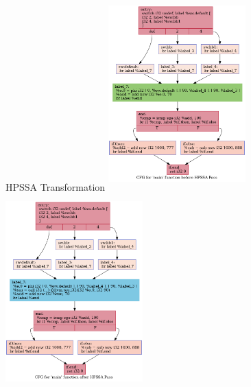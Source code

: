 \documentclass{beamer}
\begin{document}
\begin{frame}{HPSSA Transformation}
	\includegraphics[width=5.3cm,height=7.5cm]{baseline.dot.png}
	\includegraphics[width=5.3cm,height=7.5cm]{afterHPSSA.dot.png}
\end{frame}
\end{document}
